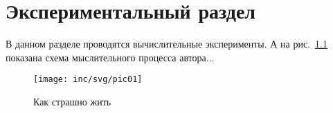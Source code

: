 \chapter{Экспериментальный раздел}
\label{cha:research}

В данном разделе проводятся вычислительные эксперименты.
А на рис.~\ref{fig:spire01} показана схема мыслительного процесса автора...

\begin{figure}
  \centering
  \texttt{[image: inc/svg/pic01]}
  \caption{Как страшно жить}
  \label{fig:spire01}
\end{figure}


